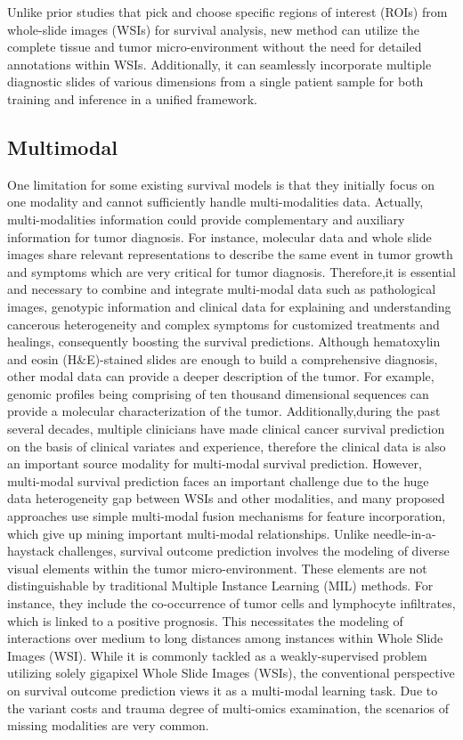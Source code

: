 \documentclass[journal,twoside,web]{ieeecolor}
\begin{document}
Unlike prior studies that pick and choose specific regions of interest (ROIs) from whole-slide images (WSIs) for survival analysis, new method can utilize the complete tissue and tumor micro-environment without the need for detailed annotations within WSIs. 
Additionally, it can seamlessly incorporate multiple diagnostic slides of various dimensions from a single patient sample for both training and inference in a unified framework.

\subsection{Multimodal}
One limitation for some existing survival models is that they initially focus on one modality and cannot sufficiently handle multi-modalities data. 
Actually, multi-modalities information could provide complementary and auxiliary information for tumor diagnosis.
For instance, molecular data and whole slide images share relevant representations to describe the same event in tumor growth and symptoms which are very critical for tumor diagnosis.
Therefore,it is essential and necessary to combine and integrate multi-modal data such as pathological images, genotypic information and clinical data for explaining and understanding cancerous heterogeneity and complex symptoms for customized treatments and healings, consequently boosting the survival predictions.
Although hematoxylin and eosin (H\&E)-stained slides are enough to build a comprehensive diagnosis, other modal data can provide a deeper description of the tumor. For example, genomic profiles being comprising of ten thousand dimensional sequences can provide a molecular characterization of the tumor.
Additionally,during the past several decades, multiple clinicians have made clinical cancer survival prediction on the basis of clinical variates and experience, therefore the clinical data is also an important source modality for multi-modal survival prediction.
However, multi-modal survival prediction faces an important challenge due to the huge data heterogeneity gap between WSIs and other modalities, and many proposed approaches use simple multi-modal fusion mechanisms for feature incorporation, which give up mining important multi-modal relationships.
Unlike needle-in-a-haystack challenges, survival outcome prediction involves the modeling of diverse visual elements within the tumor micro-environment. 
These elements are not distinguishable by traditional Multiple Instance Learning (MIL) methods. 
For instance, they include the co-occurrence of tumor cells and lymphocyte infiltrates, which is linked to a positive prognosis. 
This necessitates the modeling of interactions over medium to long distances among instances within Whole Slide Images (WSI).
While it is commonly tackled as a weakly-supervised problem utilizing solely gigapixel Whole Slide Images (WSIs), the conventional perspective on survival outcome prediction views it as a multi-modal learning task.
Due to the variant costs and trauma degree of multi-omics examination, the scenarios of missing modalities are very common.  
\end{document}
